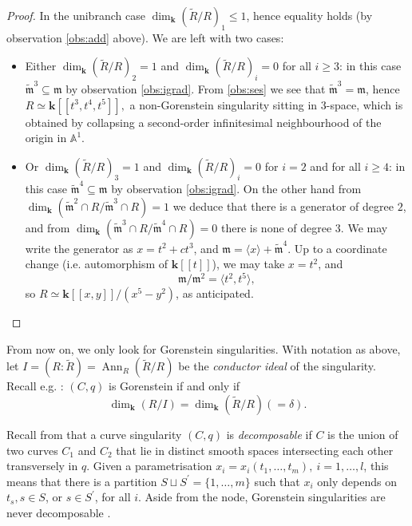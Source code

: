 \documentclass[11pt]{amsart}
\renewcommand{\k}{\mathbf k}
\newcommand{\m}{\mathfrak m}
\newcommand{\tR}{\widetilde{R}}
\newcommand{\tm}{\widetilde{\mathfrak m}}
\newcommand{\Aaff}{\mathbb A}
\theoremstyle{plain}
\theoremstyle{definition}
\begin{document}
\begin{proof}
 In the unibranch case $\dim_\k(\tR/R)_1\leq 1$, hence equality holds (by observation \eqref{obs:add} above). We are left with two cases:
 \begin{itemize}[leftmargin=15pt]
  \item Either $\dim_\k(\tR/R)_2=1$ and $\dim_\k(\tR/R)_i=0$ for all $i\geq 3$: in this case $\tm^3\subseteq\m$ by observation \eqref{obs:igrad}. From \eqref{obs:ses} we see that $\tm^3=\m$, hence $R\simeq\k[\![t^3,t^4,t^5]\!],$ a non-Gorenstein singularity sitting in $3$-space, which is obtained by collapsing a second-order infinitesimal neighbourhood of the origin in $\Aaff^1$.
  
  \item Or $\dim_\k(\tR/R)_3=1$ and $\dim_\k(\tR/R)_i=0$ for $i=2$ and for all $i\geq 4$: in this case $\tm^4\subseteq\m$ by observation \eqref{obs:igrad}. On the other hand from $\dim_\k(\tm^2\cap R/\tm^3\cap R)=1$ we deduce that there is a generator of degree $2$, and from $\dim_\k(\tm^3\cap R/\tm^4\cap R)=0$ there is none of degree $3$. We may write the generator as $x=t^2+ct^3$, and $\m=\langle x\rangle+\tm^4$. Up to a coordinate change (i.e. automorphism of $\k[\![t]\!]$), we may take $x=t^2$, and \[\m/\m^2=\langle t^2,t^5\rangle,\] so $R\simeq\k[\![x,y]\!]/(x^5-y^2)$, as anticipated.
 \end{itemize}
\end{proof}

From now on, we only look for Gorenstein singularities. With notation as above, let $I=(R:\tilde R)=\operatorname{Ann}_R(\tilde R/R)$ be the \emph{conductor ideal} of the singularity. Recall e.g. \cite[Proposition VIII.1.16]{AK}: $(C,q)$ is Gorenstein if and only if
\[\dim_\k(R/I)=\dim_\k(\tR/R)(=\delta).\]

Recall from \cite[Definition 2-1]{Stev} that a curve singularity $(C,q)$ is \emph{decomposable} if $C$ is the union of two curves $C_1$ and $C_2$ that lie in distinct smooth spaces intersecting each other transversely in $q$. Given a parametrisation $x_i=x_i(t_1,\ldots,t_m),\ i=1,\ldots,l$, this means that there is a partition $S\sqcup S^\prime=\{1,\ldots,m\}$ such that $x_i$ only depends on $t_s,s\in S$, or $s\in S^\prime$, for all $i$. Aside from the node, Gorenstein singularities are never decomposable \cite[Proposition 2.1]{AFSGm}.
\end{document}
